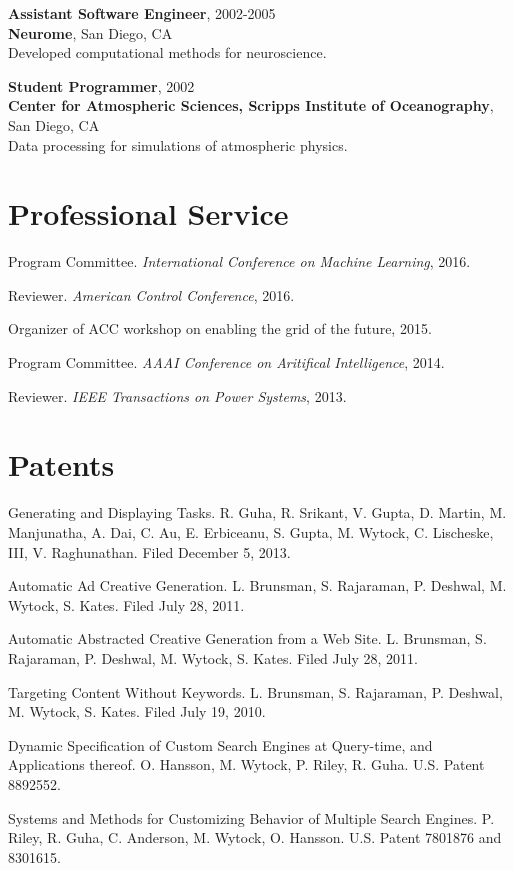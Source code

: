\documentclass[margin, line]{res}
\begin{document}
\begin{resume}
{\bf Assistant Software Engineer}, 2002-2005 \\
{\bf Neurome}, San Diego, CA \\
Developed computational methods for neuroscience.

{\bf Student Programmer}, 2002 \\
{\bf Center for Atmospheric Sciences, Scripps Institute of Oceanography}, San
Diego, CA \\
Data processing for simulations of atmospheric physics.


\section{Professional Service}

Program Committee. \emph{International Conference on Machine Learning}, 2016.

Reviewer. \emph{American Control Conference}, 2016.

Organizer of ACC workshop on enabling the grid of the future, 2015.

Program Committee. \emph{AAAI Conference on Aritifical Intelligence}, 2014.

Reviewer. \emph{IEEE Transactions on Power Systems}, 2013.

\section{Patents}

Generating and Displaying Tasks. R. Guha, R. Srikant, V. Gupta, D. Martin,
M. Manjunatha, A. Dai, C. Au,  E. Erbiceanu, S. Gupta, M. Wytock, C. Lischeske,
III, V. Raghunathan. Filed December 5, 2013.

Automatic Ad Creative Generation. L. Brunsman, S. Rajaraman, P. Deshwal,
M. Wytock, S. Kates. Filed July 28, 2011.

Automatic Abstracted Creative Generation from a Web Site. L. Brunsman,
S. Rajaraman, P. Deshwal, M. Wytock, S. Kates. Filed July 28, 2011.

Targeting Content Without Keywords. L. Brunsman, S. Rajaraman, P. Deshwal,
M. Wytock, S. Kates. Filed July 19, 2010.

Dynamic Specification of Custom Search Engines at Query-time, and Applications
thereof. O. Hansson, M. Wytock, P. Riley, R. Guha. U.S. Patent 8892552.

Systems and Methods for Customizing Behavior of Multiple Search
Engines. P. Riley, R. Guha, C. Anderson, M. Wytock, O. Hansson. U.S. Patent 7801876 and 8301615.

\end{resume}
\end{document}
